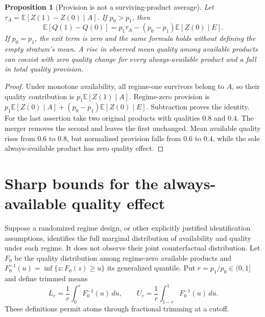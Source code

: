 \documentclass[11pt,a4paper]{article}
\newtheorem{proposition}[theorem]{Proposition}
\theoremstyle{definition}
\theoremstyle{remark}
\newcommand{\E}{\mathbb E}
\begin{document}
\begin{proposition}[Provision is not a surviving-product average]\label{pr:decomp}
Let $\tau_A=\E[Z(1)-Z(0)\mid A]$. If $p_0>p_1$, then
\[
 \E[Q(1)-Q(0)]
 =p_1\tau_A-(p_0-p_1)\E[Z(0)\mid E].
\]
If $p_0=p_1$, the exit term is zero and the same formula holds without defining the empty stratum's mean. A rise in observed mean quality among available products can coexist with zero quality change for every always-available product and a fall in total quality provision.
\end{proposition}
\begin{proof}
Under monotone availability, all regime-one survivors belong to $A$, so their quality contribution is $p_1\E[Z(1)\mid A]$. Regime-zero provision is
$p_1\E[Z(0)\mid A]+(p_0-p_1)\E[Z(0)\mid E]$. Subtraction proves the identity. For the last assertion take two original products with qualities $0.8$ and $0.4$. The merger removes the second and leaves the first unchanged. Mean available quality rises from $0.6$ to $0.8$, but normalized provision falls from $0.6$ to $0.4$, while the sole always-available product has zero quality effect.
\end{proof}

\section{Sharp bounds for the always-available quality effect}
Suppose a randomized regime design, or other explicitly justified identification assumptions, identifies the full marginal distribution of availability and quality under each regime. It does not observe their joint counterfactual distribution. Let $F_0$ be the quality distribution among regime-zero available products and $F_0^{-1}(u)=\inf\{z:F_0(z)\geq u\}$ its generalized quantile. Put $r=p_1/p_0\in(0,1]$ and define trimmed means
\[
 L_r=\frac1r\int_0^r F_0^{-1}(u)\,du,
 \qquad U_r=\frac1r\int_{1-r}^1F_0^{-1}(u)\,du.
\]
These definitions permit atoms through fractional trimming at a cutoff.
\end{document}
